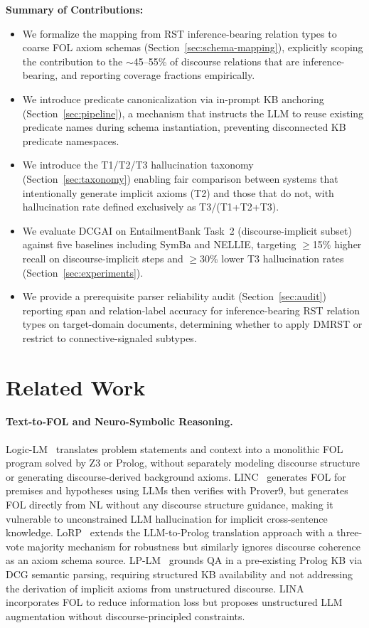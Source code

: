 \documentclass[11pt,letterpaper]{article}
\begin{document}
\noindent\textbf{Summary of Contributions:}
\begin{itemize}
  \item We formalize the mapping from RST inference-bearing relation types to coarse FOL axiom schemas
    (Section~\ref{sec:schema-mapping}), explicitly scoping the contribution to the $\sim$45--55\% of discourse
    relations that are inference-bearing, and reporting coverage fractions empirically.
  \item We introduce predicate canonicalization via in-prompt KB anchoring (Section~\ref{sec:pipeline}), a mechanism
    that instructs the LLM to reuse existing predicate names during schema instantiation, preventing disconnected KB
    predicate namespaces.
  \item We introduce the T1/T2/T3 hallucination taxonomy (Section~\ref{sec:taxonomy}) enabling fair comparison between
    systems that intentionally generate implicit axioms (T2) and those that do not, with hallucination rate defined
    exclusively as T3/(T1+T2+T3).
  \item We evaluate DCGAI on EntailmentBank Task~2 (discourse-implicit subset) against five baselines including SymBa
    and NELLIE, targeting $\geq$15\% higher recall on discourse-implicit steps and $\geq$30\% lower T3 hallucination
    rates (Section~\ref{sec:experiments}).
  \item We provide a prerequisite parser reliability audit (Section~\ref{sec:audit}) reporting span and relation-label
    accuracy for inference-bearing RST relation types on target-domain documents, determining whether to apply DMRST
    or restrict to connective-signaled subtypes.
\end{itemize}

\section{Related Work}

\paragraph{Text-to-FOL and Neuro-Symbolic Reasoning.}
Logic-LM~\citep{Pan2023} translates problem statements and context into a monolithic FOL program solved by Z3 or
Prolog, without separately modeling discourse structure or generating discourse-derived background axioms.
LINC~\citep{Olausson2023} generates FOL for premises and hypotheses using LLMs then verifies with Prover9, but
generates FOL directly from NL without any discourse structure guidance, making it vulnerable to unconstrained LLM
hallucination for implicit cross-sentence knowledge. LoRP~\citep{Di2025} extends the LLM-to-Prolog translation
approach with a three-vote majority mechanism for robustness but similarly ignores discourse coherence as an axiom
schema source. LP-LM~\citep{Wu2025} grounds QA in a pre-existing Prolog KB via DCG semantic parsing, requiring
structured KB availability and not addressing the derivation of implicit axioms from unstructured discourse.
LINA~\citep{Li2024} incorporates FOL to reduce information loss but proposes unstructured LLM augmentation without
discourse-principled constraints.
\end{document}
